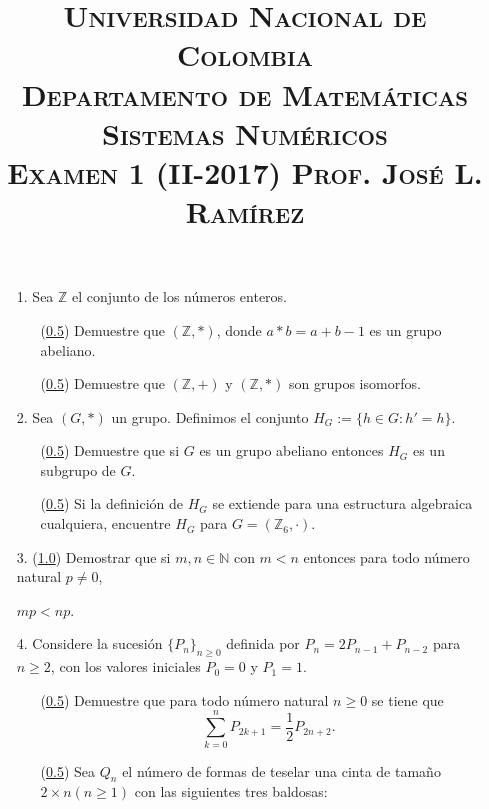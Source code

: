 \documentclass[letterpaper]{article} %
\title{
  \textsc{
    \Large{Universidad Nacional de Colombia\\ Departamento de Matemáticas}\\ \vspace{0.1cm} 
    \large{Sistemas Numéricos}\\ \vspace{-0.1cm}
    \large{Examen 1 (II-2017) \hspace{1cm} Prof. José L. Ramírez}
  }
}
\date{}
\begin{document}
  
  \maketitle
  \vspace{-1cm}
  
  \vspace{0.5cm}
  
  \begin{itemize}
    
    \item[1.] Sea $\mathbb{Z}$ el conjunto de los números enteros.

      \begin{itemize}
      \item[\tiny{\ding{110}}] (\underline{0.5}) Demuestre que $\left( \mathbb{Z}, * \right)$, donde $a*b=a+b-1$ es un grupo abeliano.
      \item[\tiny{\ding{110}}] (\underline{0.5}) Demuestre que $\left( \mathbb{Z}, +\right)$ y $\left( \mathbb{Z}, *\right)$ son grupos isomorfos.
      \end{itemize}

    \item[2.] Sea $\left( G, *\right)$ un grupo. Definimos el conjunto $H_{G}:=\{h \in G: h'=h\}$.

      \begin{itemize}
      \item[\tiny{\ding{110}}] (\underline{0.5}) Demuestre que si $G$ es un grupo abeliano entonces $H_{G}$ es un subgrupo de $G$.
      \item[\tiny{\ding{110}}] (\underline{0.5}) Si la definición de $H_{G}$ se extiende para una estructura algebraica cualquiera, encuentre $H_{G}$ para $G=\left(\mathbb{Z}_{6}, \cdot \right)$.
      \end{itemize}

    \item[3.] (\underline{1.0}) Demostrar que si $m,n \in \mathbb{N}$ con $m<n$ entonces para todo número natural $p\neq0$,
      \begin{center}
        $mp<np$.
      \end{center}

    \item[4.] Considere la sucesión $\{P_{n} \}_{n\geq 0}$ definida por $P_{n}=2P_{n-1}+P_{n-2}$ para $n\geq 2$, con los valores iniciales $P_{0}=0$ y $P_{1}=1$.

      \begin{itemize}
      \item[\tiny{\ding{110}}] (\underline{0.5}) Demuestre que para todo número natural $n\geq 0$ se tiene que
      \begin{equation*}
        \sum_{k=0}^{n} P_{2k+1} = \frac{1}{2}P_{2n+2}.
      \end{equation*}
      \item[\tiny{\ding{110}}] (\underline{0.5}) Sea $Q_{n}$ el número de formas de teselar una cinta de tamaño $2\times n \left(n\geq 1\right)$ con las siguientes tres baldosas:\\


\end{itemize}
\end{itemize}
\end{document}
